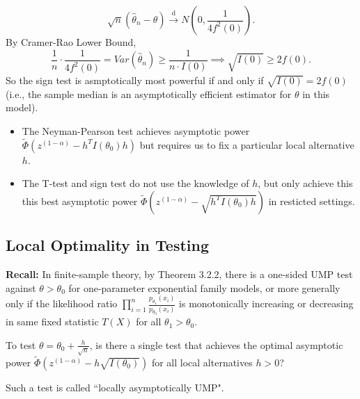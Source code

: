 \documentclass[a4paper]{article}
\begin{document}
\begin{eg}
\begin{equation*}
		\sqrt{n} \left(\hat{\theta}_n - \theta\right) \stackrel{\text{d}}{\longrightarrow} N \left(0,\frac{1}{4f^2(0)}\right).
	\end{equation*}
	By Cramer-Rao Lower Bound,
	\begin{equation*}
		\frac{1}{n} \cdot \frac{1}{4f^2(0)}  = Var(\hat{\theta}_n) \geq \frac{1}{n \cdot I(0)} \implies \sqrt{I(0)} \geq 2 f(0).
	\end{equation*}
	So the sign test is asmptotically most powerful if and only if $\sqrt{I(0)} = 2 f(0)$ (i.e., the sample median is an asymptotically efficient estimator for $\theta$ in this model).
\end{eg}

\begin{remark}
	\quad
	\begin{itemize}
		\item The Neyman-Pearson test achieves asymptotic power $\tilde{\Phi}\left(z^{(1-\alpha)} - h^TI(\theta_0)h\right)$ but requires us to fix a particular local alternative $h$.
		\item The T-test and sign test do not use the knowledge of $h$, but only achieve this this best asymptotic power $\tilde{\Phi}\left(z^{(1-\alpha)} - \sqrt{h^TI(\theta_0)h}\right)$ in resticted settings.
	\end{itemize}
\end{remark}

\subsection{Local Optimality in Testing}

\textbf{Recall:} In finite-sample theory, by Theorem 3.2.2, there is a one-sided UMP test against $\theta > \theta_0$ for one-parameter exponential family models, or more generally only if the likelihood ratio $\prod\limits_{i=1}^n\frac{p_{\theta_1}(x_i)}{p_{\theta_0}(x_i)}$ is monotonically increasing or decreasing in same fixed statistic $T(X)$ for all $\theta_1 > \theta_0$.

\begin{question}
	To test $\theta = \theta_0 + \frac{h}{\sqrt{n}}$, is there a single test that achieves the optimal asymptotic power $\tilde{\Phi} \left(z^{(1-\alpha)} - h \sqrt{I(\theta_0)} \right)$ for all local alternatives $h > 0$?
\end{question}

\begin{note}
	Such a test is called ``locally asymptotically UMP".
\end{note}
\end{document}
